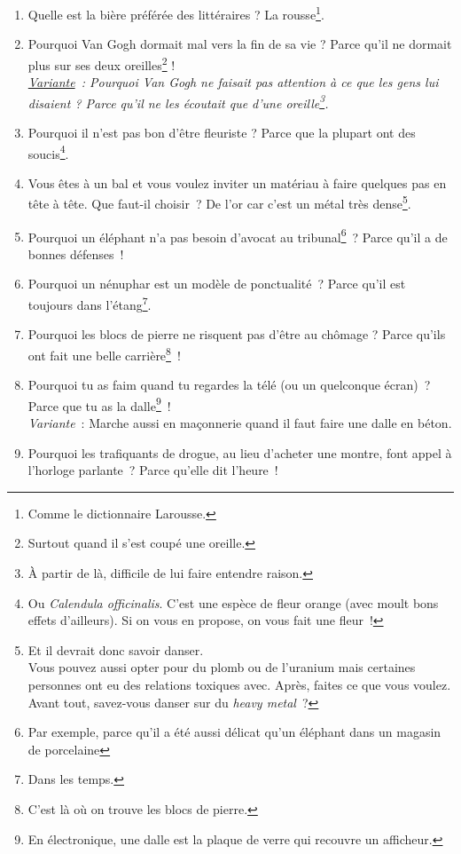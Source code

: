 \documentclass[10pt,a5paper,fullpage]{book}
\begin{document}
\begin{enumerate}
		\item Quelle est la bière préférée des littéraires ? La rousse\footnote{Comme le dictionnaire Larousse.}.
		\item Pourquoi Van Gogh dormait mal vers la fin de sa vie ? Parce qu'il ne dormait plus sur ses deux oreilles\footnote{Surtout quand il s'est coupé une oreille.} !
		\\\textit{\underline{Variante}~: Pourquoi Van Gogh ne faisait pas attention à ce que les gens lui disaient ? Parce qu'il ne les écoutait que d'une oreille\footnote{À partir de là, difficile de lui faire entendre raison.}.}
		\item Pourquoi il n'est pas bon d'être fleuriste ? Parce que la plupart ont des soucis\footnote{Ou \textit{Calendula officinalis}. C'est une espèce de fleur orange (avec moult bons effets d'ailleurs). Si on vous en propose, on vous fait une fleur~!}. 
		\item Vous êtes à un bal et vous voulez inviter un matériau à faire quelques pas en tête à tête. Que faut-il choisir~? De l'or car c'est un métal très dense\footnote{Et il devrait donc savoir danser. \\Vous pouvez aussi opter pour du plomb ou de l'uranium mais certaines personnes ont eu des relations toxiques avec. Après, faites ce que vous voulez. \\Avant tout, savez-vous danser sur du \textit{heavy metal}~?}.  
		\item Pourquoi un éléphant n'a pas besoin d'avocat au tribunal\footnote{Par exemple, parce qu'il a été aussi délicat qu'un éléphant dans un magasin de porcelaine}~? Parce qu'il a de bonnes défenses~!
		\item Pourquoi un nénuphar est un modèle de ponctualité~? Parce qu'il est toujours dans l'étang\footnote{Dans les temps.}.
		\item Pourquoi les blocs de pierre ne risquent pas d'être au chômage ? Parce qu'ils ont fait une belle carrière\footnote{C'est là où on trouve les blocs de pierre.}~!
		\item Pourquoi tu as faim quand tu regardes la télé (ou un quelconque écran)~? Parce que tu as la dalle\footnote{En électronique, une dalle est la plaque de verre qui recouvre un afficheur.}~!
		\\ \textit{Variante}~: Marche aussi en maçonnerie quand il faut faire une dalle en béton. 
		\item Pourquoi les trafiquants de drogue, au lieu d'acheter une montre, font appel à l'horloge parlante~? Parce qu'elle dit l'heure~!

\end{enumerate}
\end{document}
